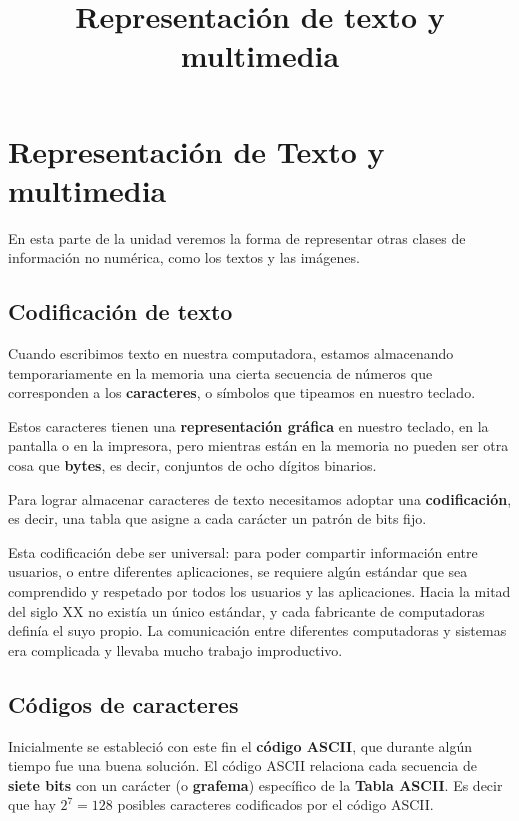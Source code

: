 \documentclass[spanish,A4,]{article}
\title{Representación de texto y multimedia}
\begin{document}
\maketitle

\section{Representación de Texto y
multimedia}\label{representaciuxf3n-de-texto-y-multimedia}

En esta parte de la unidad veremos la forma de representar otras clases
de información no numérica, como los textos y las imágenes.

\subsection{Codificación de texto}\label{codificaciuxf3n-de-texto}

Cuando escribimos texto en nuestra computadora, estamos almacenando
temporariamente en la memoria una cierta secuencia de números que
corresponden a los \textbf{caracteres}, o símbolos que tipeamos en
nuestro teclado.

Estos caracteres tienen una \textbf{representación gráfica} en nuestro
teclado, en la pantalla o en la impresora, pero mientras están en la
memoria no pueden ser otra cosa que \textbf{bytes}, es decir, conjuntos
de ocho dígitos binarios.

Para lograr almacenar caracteres de texto necesitamos adoptar una
\textbf{codificación}, es decir, una tabla que asigne a cada carácter un
patrón de bits fijo.

Esta codificación debe ser universal: para poder compartir información
entre usuarios, o entre diferentes aplicaciones, se requiere algún
estándar que sea comprendido y respetado por todos los usuarios y las
aplicaciones. Hacia la mitad del siglo XX no existía un único estándar,
y cada fabricante de computadoras definía el suyo propio. La
comunicación entre diferentes computadoras y sistemas era complicada y
llevaba mucho trabajo improductivo.

\subsection{Códigos de caracteres}\label{cuxf3digos-de-caracteres}

Inicialmente se estableció con este fin el \textbf{código ASCII}, que
durante algún tiempo fue una buena solución. El código ASCII relaciona
cada secuencia de \textbf{siete bits} con un carácter (o
\textbf{grafema}) específico de la \textbf{Tabla ASCII}. Es decir que
hay $2^7 = 128$ posibles caracteres codificados por el código ASCII.
\end{document}
